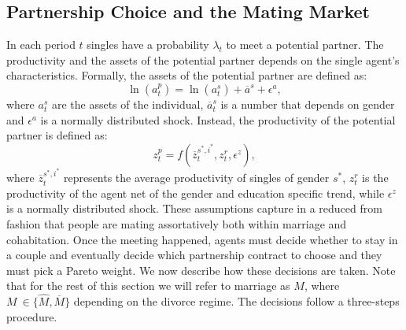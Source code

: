 \documentclass[12pt]{article}
\numberwithin{table}{section}
\begin{document}
\subsection{Partnership Choice and the Mating Market}\label{ssec:marriage_market}
In each period $t$ singles have a probability $\lambda_t$ to meet a potential partner. The productivity and the assets of the potential partner depends on the single agent's characteristics. Formally, the assets of the potential partner are defined as:
\begin{equation}\label{eq:mma}
\ln(a^p_t)=\ln(a^s_t)+\overline{a}^{s}+\epsilon^a,
\end{equation}
where $a^s_t$ are the assets of the individual, $\overline{a}^{s}_t$ is a number that depends on gender and $\epsilon^a$ is a normally distributed shock. Instead, the productivity of the potential partner is defined as:
\begin{equation}\label{eq:mmz}
z_t^p=f(\overline{z}^{s^*,i^*}_t,z^r_t,\epsilon^z),
\end{equation}
where $\overline{z}^{s^*,i^*}_t$ represents the average productivity of singles of gender $s^*$,  $z^r_t$ is the productivity of the agent net of the gender and education specific trend, while $\epsilon^z$ is a normally distributed shock. These assumptions capture in a reduced from fashion that people are mating assortatively both within marriage and cohabitation.
Once the meeting happened, agents must decide whether to stay in a couple and eventually decide which partnership contract to choose and they must pick a Pareto weight. We now describe how these decisions are taken. Note that for the rest of this section we will refer to marriage as $M$, where $M \ \in\{\hat{M},\overline{M}\}$ depending on the divorce regime. The decisions follow a three-steps procedure. 
\end{document}
